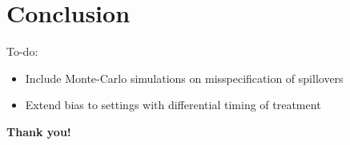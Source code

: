 \documentclass[aspectratio=43]{beamer}
\begin{document}
\section{Conclusion}

\begin{frame}{To-do:}
    \begin{itemize}
        \item Include Monte-Carlo simulations on misspecification of spillovers
        
        \item Extend bias to settings with differential timing of treatment
    \end{itemize}
\end{frame}

\begin{frame}
    \begin{center}
        \Large \textbf{Thank you!}
    \end{center}
\end{frame}
\end{document}
